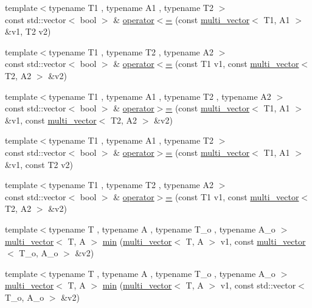\begin{DoxyCompactItemize}
\item 
{\footnotesize template$<$typename T1 , typename A1 , typename T2 $>$ }\\const std\-::vector$<$ bool $>$ \& \hyperlink{namespaceIceBRG_a2840f4f6c157ae44809aa2147cb5634b}{operator$<$=} (const \hyperlink{classIceBRG_1_1multi__vector}{multi\-\_\-vector}$<$ T1, A1 $>$ \&v1, T2 v2)
\item 
{\footnotesize template$<$typename T1 , typename T2 , typename A2 $>$ }\\const std\-::vector$<$ bool $>$ \& \hyperlink{namespaceIceBRG_aa5d89b08e3fb79a1e60fb1b0bec45c87}{operator$<$=} (const T1 v1, const \hyperlink{classIceBRG_1_1multi__vector}{multi\-\_\-vector}$<$ T2, A2 $>$ \&v2)
\item 
{\footnotesize template$<$typename T1 , typename A1 , typename T2 , typename A2 $>$ }\\const std\-::vector$<$ bool $>$ \& \hyperlink{namespaceIceBRG_a96bb204a67d7c22b5b0478290744c36c}{operator$>$=} (const \hyperlink{classIceBRG_1_1multi__vector}{multi\-\_\-vector}$<$ T1, A1 $>$ \&v1, const \hyperlink{classIceBRG_1_1multi__vector}{multi\-\_\-vector}$<$ T2, A2 $>$ \&v2)
\item 
{\footnotesize template$<$typename T1 , typename A1 , typename T2 $>$ }\\const std\-::vector$<$ bool $>$ \& \hyperlink{namespaceIceBRG_a593cbe10c8b991eed3439719f440bbb1}{operator$>$=} (const \hyperlink{classIceBRG_1_1multi__vector}{multi\-\_\-vector}$<$ T1, A1 $>$ \&v1, const T2 v2)
\item 
{\footnotesize template$<$typename T1 , typename T2 , typename A2 $>$ }\\const std\-::vector$<$ bool $>$ \& \hyperlink{namespaceIceBRG_ac43383dc65efeb8b2c80995ef751aad8}{operator$>$=} (const T1 v1, const \hyperlink{classIceBRG_1_1multi__vector}{multi\-\_\-vector}$<$ T2, A2 $>$ \&v2)
\item 
{\footnotesize template$<$typename T , typename A , typename T\-\_\-o , typename A\-\_\-o $>$ }\\\hyperlink{classIceBRG_1_1multi__vector}{multi\-\_\-vector}$<$ T, A $>$ \hyperlink{namespaceIceBRG_ab587eb53926cf8e4dbee0fd61d4e7c3a}{min} (\hyperlink{classIceBRG_1_1multi__vector}{multi\-\_\-vector}$<$ T, A $>$ v1, const \hyperlink{classIceBRG_1_1multi__vector}{multi\-\_\-vector}$<$ T\-\_\-o, A\-\_\-o $>$ \&v2)
\item 
{\footnotesize template$<$typename T , typename A , typename T\-\_\-o , typename A\-\_\-o $>$ }\\\hyperlink{classIceBRG_1_1multi__vector}{multi\-\_\-vector}$<$ T, A $>$ \hyperlink{namespaceIceBRG_ac7d617bf12fb3e93fed83f86a8857e82}{min} (\hyperlink{classIceBRG_1_1multi__vector}{multi\-\_\-vector}$<$ T, A $>$ v1, const std\-::vector$<$ T\-\_\-o, A\-\_\-o $>$ \&v2)

\end{DoxyCompactItemize}
